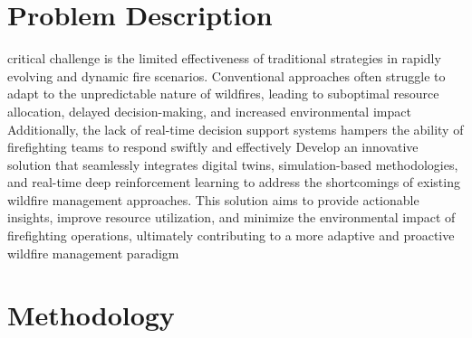 \documentclass{scspaperproc}
\theoremstyle{scsthe}
\begin{document}
\section{Problem Description}\label{Problem Description}




critical challenge is the limited effectiveness of traditional strategies in rapidly evolving and dynamic fire scenarios. Conventional approaches often struggle to adapt to the unpredictable nature of wildfires, leading to suboptimal resource allocation, delayed decision-making, and increased environmental impact
Additionally, the lack of real-time decision support systems hampers the ability of firefighting teams to respond swiftly and effectively
Develop an innovative solution that seamlessly integrates digital twins, simulation-based methodologies, and real-time deep reinforcement learning to address the shortcomings of existing wildfire management approaches. This solution aims to provide actionable insights, improve resource utilization, and minimize the environmental impact of firefighting operations, ultimately contributing to a more adaptive and proactive wildfire management paradigm








\section{Methodology}\label{Methodology}
\end{document}
